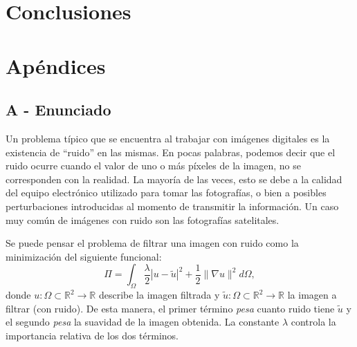 \documentclass[a4paper]{article}
\begin{document}
\section{Conclusiones}


\newpage

\section{Apéndices}

\subsection{A - Enunciado}

Un problema típico que se encuentra al trabajar con imágenes digitales es la existencia de ``ruido'' en las mismas. En pocas palabras, podemos decir que el ruido ocurre cuando el valor de uno o más píxeles de la imagen, no se corresponden con la realidad. La mayor\'ia de las veces, esto se debe a la calidad del equipo electr\'onico utilizado para tomar las fotograf\'ias, o bien a posibles perturbaciones introducidas al momento de transmitir la informaci\'on. Un caso muy com\'un de im\'agenes con ruido son las fotograf\'ias satelitales.


Se puede pensar el problema de filtrar una imagen con ruido como la minimizaci\'on del siguiente funcional:
\begin{equation}
  \Pi = \int_\Omega {\frac{\lambda}{2} \left| u - \tilde{u} \right|^2 + \frac{1}{2} \lVert \nabla u \rVert^2 } d\Omega,
\label{funcional}
\end{equation}
donde $u : \Omega \subset \mathbb{R}^2 \to \mathbb{R}$ describe la imagen filtrada y
$\tilde{u} : \Omega \subset \mathbb{R}^2 \to \mathbb{R}$ la imagen a filtrar (con ruido).
De esta manera, el primer t\'ermino \emph{pesa} cuanto ruido tiene $\tilde{u}$ y el segundo \emph{pesa} la suavidad de la imagen obtenida. La constante $\lambda$ controla la importancia relativa de los dos t\'erminos.
\end{document}
